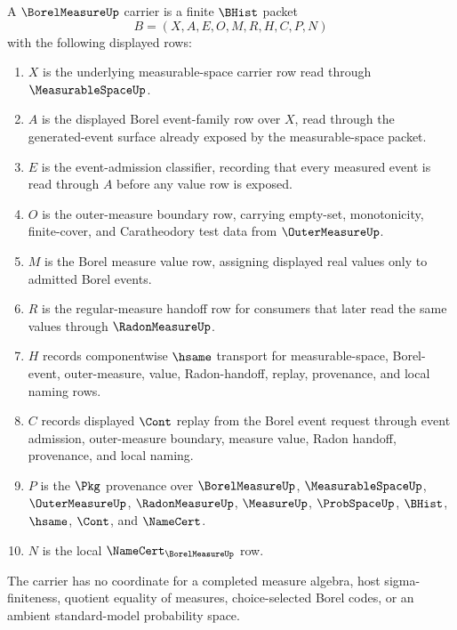 \begin{definition}
\label{def:borel-measure-carrier}
A $\BorelMeasureUp$ carrier is a finite $\BHist$ packet
$$
B=(X,A,E,O,M,R,H,C,P,N)
$$
with the following displayed rows:
\begin{enumerate}
\item $X$ is the underlying measurable-space carrier row read through $\MeasurableSpaceUp$.
\item $A$ is the displayed Borel event-family row over $X$, read through the generated-event surface already exposed by the measurable-space packet.
\item $E$ is the event-admission classifier, recording that every measured event is read through $A$ before any value row is exposed.
\item $O$ is the outer-measure boundary row, carrying empty-set, monotonicity, finite-cover, and Caratheodory test data from $\OuterMeasureUp$.
\item $M$ is the Borel measure value row, assigning displayed real values only to admitted Borel events.
\item $R$ is the regular-measure handoff row for consumers that later read the same values through $\RadonMeasureUp$.
\item $H$ records componentwise $\hsame$ transport for measurable-space, Borel-event, outer-measure, value, Radon-handoff, replay, provenance, and local naming rows.
\item $C$ records displayed $\Cont$ replay from the Borel event request through event admission, outer-measure boundary, measure value, Radon handoff, provenance, and local naming.
\item $P$ is the $\Pkg$ provenance over $\BorelMeasureUp$, $\MeasurableSpaceUp$, $\OuterMeasureUp$, $\RadonMeasureUp$, $\MeasureUp$, $\ProbSpaceUp$, $\BHist$, $\hsame$, $\Cont$, and $\NameCert$.
\item $N$ is the local $\NameCert_{\BorelMeasureUp}$ row.
\end{enumerate}
The carrier has no coordinate for a completed measure algebra, host sigma-finiteness, quotient equality of measures, choice-selected Borel codes, or an ambient standard-model probability space.
\end{definition}

